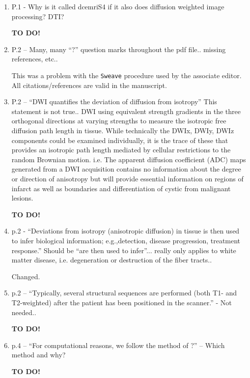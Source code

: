 \documentclass[11pt]{article}
\begin{document}
\begin{enumerate}

\item P.1 - Why is it called dcemriS4 if it also does diffusion
  weighted image processing? DTI?

  \textbf{TO DO!}

\item P.2 – Many, many ``?'' question marks throughout the pdf
  file.. missing references, etc..

  This was a problem with the \texttt{Sweave} procedure used by the
  associate editor.  All citations/references are valid in the
  manuscript.

\item P.2 – ``DWI quantifies the deviation of diffusion from
  isotropy'' This statement is not true..  DWI using equivalent
  strength gradients in the three orthogonal directions at varying
  strengths to measure the isotropic free diffusion path length in
  tissue. While technically the DWIx, DWIy, DWIz components could be
  examined individually, it is the trace of these that provides an
  isotropic path length mediated by cellular restrictions to the
  random Brownian motion.  i.e. The apparent diffusion coefficient
  (ADC) maps generated from a DWI acquisition contains no information
  about the degree or direction of anisotropy but will provide
  essential information on regions of infarct as well as boundaries
  and differentiation of cystic from malignant lesions.

  \textbf{TO DO!}

\item p.2 - ``Deviations from isotropy (anisotropic diffusion) in
  tissue is then used to infer biological information; e.g.,detection,
  disease progression, treatment response.''  Should be ``are then
  used to infer''... really only applies to white matter disease, i.e.
  degeneration or destruction of the fiber tracts..

  Changed.

\item p.2 – ``Typically, several structural sequences are performed
  (both T1- and T2-weighted) after the patient has been positioned in
  the scanner.'' - Not needed..

  \textbf{TO DO!}

\item p.4 – ``For computational reasons, we follow the method of ?'' –
  Which method and why?

  \textbf{TO DO!}


\end{enumerate}
\end{document}
